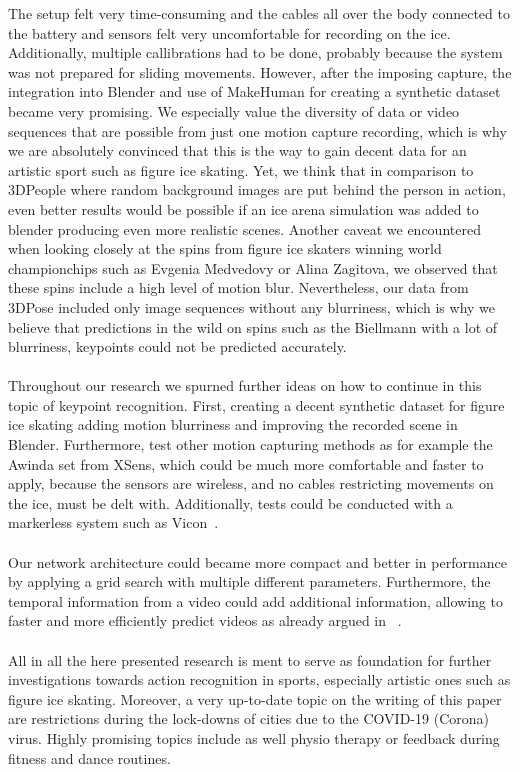 The setup felt very time-consuming and the cables all over the body connected to the battery and sensors felt very uncomfortable
for recording on the ice.
Additionally, multiple callibrations had to be done, probably because the system was not prepared
for sliding movements.
However, after the imposing capture, the integration into Blender and use of MakeHuman for creating a synthetic dataset
became very promising.
We especially value the diversity of data or video sequences that are possible from just one motion capture recording,
which is why we are absolutely convinced that this is the way to gain decent data for an artistic sport such as figure
ice skating.
Yet, we think that in comparison to 3DPeople where random background images are put behind the person in action, even
better results would be possible if an ice arena simulation was added to blender producing even more realistic scenes.
Another caveat we encountered when looking closely at the spins from figure ice skaters winning world championchips such as
Evgenia Medvedovy or Alina Zagitova, we observed that these spins include a high level of motion blur.
Nevertheless, our data from 3DPose included only image sequences without any blurriness, which is why we believe that
predictions in the wild on spins such as the Biellmann with a lot of blurriness, keypoints could not be predicted accurately.
\\\mbox{}\\
Throughout our research we spurned further ideas on how to continue in this topic of keypoint recognition.
First, creating a decent synthetic dataset for figure ice skating adding motion blurriness and improving the recorded scene
in Blender.
Furthermore, test other motion capturing methods as for example the Awinda set from XSens, which could be much more comfortable
and faster to apply, because the sensors are wireless, and no cables restricting movements on the ice, must be delt with.
Additionally, tests could be conducted with a markerless system such as Vicon~\cite{mocapoptical}.
\\\mbox{}\\
Our network architecture could became more compact and better in performance by applying a grid search with multiple different
parameters.
Furthermore, the temporal information from a video could add additional information, allowing to faster and more efficiently
predict videos as already argued in ~\cite{staf}.
\\\mbox{}\\
All in all the here presented research is ment to serve as foundation for further investigations towards action recognition
in sports, especially artistic ones such as figure ice skating.
Moreover, a very up-to-date topic on the writing of this paper are restrictions during the lock-downs of cities due to the
COVID-19 (Corona) virus.
Highly promising topics include as well physio therapy or feedback during fitness and dance routines.

